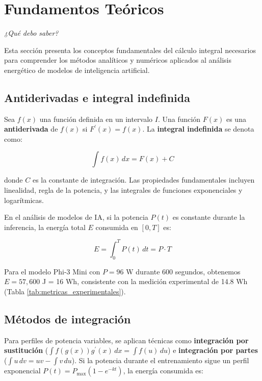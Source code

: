 \clearpage
\section{Fundamentos Teóricos}
\textit{¿Qué debo saber?}

Esta sección presenta los conceptos fundamentales del cálculo integral necesarios para comprender los métodos analíticos y numéricos aplicados al análisis energético de modelos de inteligencia artificial.

\subsection{Antiderivadas e integral indefinida}

Sea $f(x)$ una función definida en un intervalo $I$. Una función $F(x)$ es una \textbf{antiderivada} de $f(x)$ si $F^{\prime}(x) = f(x)$. La \textbf{integral indefinida} se denota como:

\begin{equation}
\int f(x) \, dx = F(x) + C
\end{equation}

donde $C$ es la constante de integración. Las propiedades fundamentales incluyen linealidad, regla de la potencia, y las integrales de funciones exponenciales y logarítmicas.

En el análisis de modelos de IA, si la potencia $P(t)$ es constante durante la inferencia, la energía total $E$ consumida en $[0, T]$ es:

\begin{equation}
E = \int_0^T P(t) \, dt = P \cdot T
\end{equation}

Para el modelo Phi-3 Mini con $P = 96$ W durante 600 segundos, obtenemos $E = 57{,}600$ J = 16 Wh, consistente con la medición experimental de 14.8 Wh (Tabla \ref{tab:metricas_experimentales}).

\subsection{Métodos de integración}

Para perfiles de potencia variables, se aplican técnicas como \textbf{integración por sustitución} ($\int f(g(x)) g^{\prime}(x) \, dx = \int f(u) \, du$) e \textbf{integración por partes} ($\int u \, dv = uv - \int v \, du$). Si la potencia durante el entrenamiento sigue un perfil exponencial $P(t) = P_{\text{max}} (1 - e^{-kt})$, la energía consumida es:

